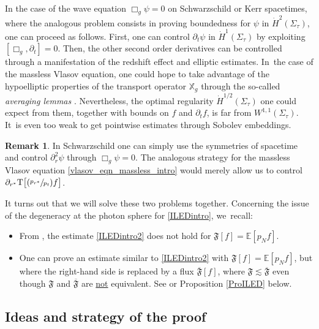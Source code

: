 \documentclass[JEP,XML,SOM,Unicode,published]{cedram}
\newcommand{\Psfrac}[2]{(\sfrac{#1}{#2})}
\theoremstyle{plain}
\theoremstyle{definition}
\newtheorem{remark}[proposition]{Remark}
\newcommand\T{{\mathbb{X}}}
\begin{document}
\begin{enumerate}
In the case of the wave equation $\Box_g \psi =0$ on Schwarzschild or Kerr spacetimes, where the analogous problem consists in proving boundedness for $\psi$ in $\dot{H}^2(\Sigma_\tau)$, one can proceed as follows. First, one can control $\partial_t \psi$ in $\dot{H}^1(\Sigma_\tau)$ by exploiting $[\Box_g, \partial_t ]=0$. Then, the other second order derivatives can be controlled through a manifestation of the redshift effect and elliptic estimates. In~the case of the massless Vlasov equation, one could hope to take advantage of the hypoelliptic properties of the transport operator $\T_g$ through the so-called \textit{averaging lemmas} \cite{Ag84, averaginglemmas}. Nevertheless, the optimal regularity $\dot{H}^{1/2}(\Sigma_\tau)$ one could expect from them, together with bounds on $f$ and $\partial_t f$, is far from $W^{1,1}(\Sigma_\tau)$. It~is even too weak to get pointwise estimates through Sobolev embeddings.

\begin{remark}
In Schwarzschild one can simply use the symmetries of spacetime and control $\partial_r^2 \psi$ through $\Box_g \psi =0$. The analogous strategy for the massless Vlasov equation \eqref{vlasov_eqn_massless_intro} would merely allow us to control $\partial_{r^*} \mathrm{T}\bigl[\Psfrac{p_{r^*}}{p_t}f \bigr]$.
\end{remark}
\end{enumerate}

It turns out that we will solve these two problems together. Concerning the issue of the degeneracy at the photon sphere for \eqref{ILEDintro}, we~recall:
\begin{itemize}
\item From \cite[Prop.\,3.12]{L23}, the estimate \eqref{ILEDintro2} does not hold for $\mathfrak{F}[f]=\mathbb{E}[p_Nf]$.
\item One can prove an estimate similar to \eqref{ILEDintro2} with $\mathfrak{F}[f]=\mathbb{E}[p_Nf]$, but where the right-hand side is replaced by a flux $\overline{\mathfrak{F}}[f]$, where $\mathfrak{F} \lesssim \overline{\mathfrak{F}}$ even though $\mathfrak{F}$ and $\overline{\mathfrak{F}}$ are \underline{not} equivalent. See \cite[Prop.\,3.2]{L23} or Proposition \ref{ProILED} below.
\end{itemize}

\subsection{Ideas and strategy of the proof}\label{Subsecideas}
\end{document}
